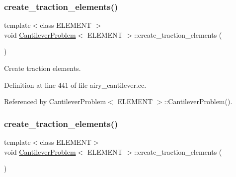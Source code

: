 \mbox{\label{classCantileverProblem_abb6f19d964d96a531bf1a60732c72ce9}} 
\subsubsection{\texorpdfstring{create\+\_\+traction\+\_\+elements()}{create\_traction\_elements()}\hspace{0.1cm}{\footnotesize\ttfamily [1/2]}}
{\footnotesize\ttfamily template$<$class E\+L\+E\+M\+E\+NT $>$ \\
void \hyperlink{classCantileverProblem}{Cantilever\+Problem}$<$ E\+L\+E\+M\+E\+NT $>$\+::create\+\_\+traction\+\_\+elements (\begin{DoxyParamCaption}{ }\end{DoxyParamCaption})\hspace{0.3cm}{\ttfamily [private]}}



Create traction elements. 



Definition at line 441 of file airy\+\_\+cantilever.\+cc.



Referenced by Cantilever\+Problem$<$ E\+L\+E\+M\+E\+N\+T $>$\+::\+Cantilever\+Problem().

\mbox{\label{classCantileverProblem_abb6f19d964d96a531bf1a60732c72ce9}} 
\subsubsection{\texorpdfstring{create\+\_\+traction\+\_\+elements()}{create\_traction\_elements()}\hspace{0.1cm}{\footnotesize\ttfamily [2/2]}}
{\footnotesize\ttfamily template$<$class E\+L\+E\+M\+E\+NT$>$ \\
void \hyperlink{classCantileverProblem}{Cantilever\+Problem}$<$ E\+L\+E\+M\+E\+NT $>$\+::create\+\_\+traction\+\_\+elements (\begin{DoxyParamCaption}{ }\end{DoxyParamCaption})\hspace{0.3cm}{\ttfamily [private]}}



